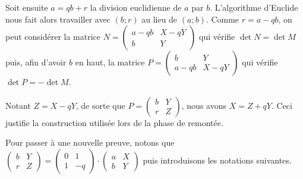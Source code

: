 \medskip


Soit ensuite $a = qb + r$ la division euclidienne de $a$ par $b$. L'algorithme d'Euclide nous fait alors travailler avec $(b ; r)$ au lieu de $(a ; b)$. Comme $r = a - qb$, on peut considérer la matrice
$N 
 =
 \begin{pmatrix}
	a - qb & X - qY \\ 
	b      & Y
 \end{pmatrix}$
qui vérifie $\det N = \det M$ puis, afin d'avoir $b$ en haut, la matrice
$P 
 =
 \begin{pmatrix}
	b      & Y      \\
	a - qb & X - qY 
 \end{pmatrix}$
qui vérifie $\det P = -\det M$.
 

\medskip


Notant $Z = X - qY$, de sorte que 
$P 
 =
 \begin{pmatrix}
	b & Y \\ 
	r & Z
 \end{pmatrix}$,
nous avons $X = Z + qY$. Ceci justifie la construction utilisée lors de la phase de remontée.
 

\bigskip


Pour passer à une nouvelle preuve, notons que
$\begin{pmatrix}
	b & Y \\ 
	r & Z
 \end{pmatrix}
 =
 \begin{pmatrix}
	0 & 1  \\ 
	1 & -q
 \end{pmatrix}
 \cdot
 \begin{pmatrix}
	a & X \\ 
	b & Y
 \end{pmatrix}$
puis introduisons les notations suivantes.

